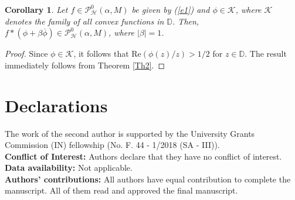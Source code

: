 \documentclass[11pt,reqno]{amsart}
\newtheorem{cor}{Corollary}[section]
\newtheorem{open problem}{Open problem}[section]
\newcommand{\ol}{\overline}
\numberwithin{equation}{section}
\begin{document}
\begin{cor} Let $f\in\mathcal{P}_{\mathcal{H}}^0(\alpha,M)$ be given by (\ref{e1}) and $\phi\in\mathcal{K}$, where $\mathcal{K}$ denotes the family of all convex functions in $\mathbb{D}$. Then, 
$f*\left(\phi+\beta\ol{\phi}\right)\in\mathcal{P}_{\mathcal{H}}^0(\alpha,M)$, where $|\beta|=1$.\end{cor}
\begin{proof} Since $\phi\in\mathcal{K}$, it follows that $\text{Re}\left(\phi(z)/z\right)>1/2$ for $z\in\mathbb{D}$. The result immediately follows from \textrm{Theorem \ref{Th2}}.\end{proof}
 \section*{Declarations}
 The work of the second author is supported by the University Grants Commission (IN) fellowship (No. F. 44 - 1/2018 (SA - III)).\\
{\bf Conflict of Interest:} Authors declare that they have no conflict of interest.\\
{\bf Data availability:} Not applicable.\\
{\bf Authors' contributions:} All authors have equal contribution to complete the manuscript. All of them read and approved the final manuscript.
\end{document}
